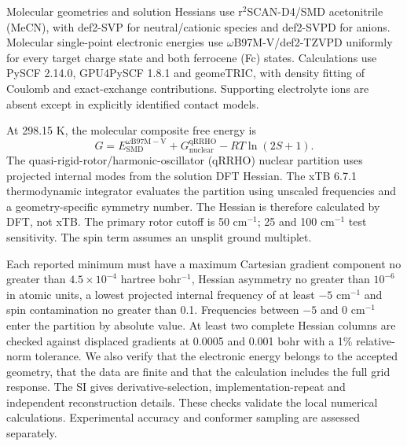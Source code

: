 \documentclass[11pt]{article}
\begin{document}
Molecular geometries and solution Hessians use r$^2$SCAN-D4/SMD acetonitrile (MeCN), with def2-SVP for neutral/cationic species and def2-SVPD for anions.\cite{r2scan2020,d42019,smd2009,def22005,diffuse2010} Molecular single-point electronic energies use $\omega$B97M-V/def2-TZVPD uniformly for every target charge state and both ferrocene (Fc) states.\cite{wb97mv2016} Calculations use PySCF 2.14.0, GPU4PySCF 1.8.1 and geomeTRIC, with density fitting of Coulomb and exact-exchange contributions.\cite{pyscf2020,gpu4pyscf2024,geometric2016} Supporting electrolyte ions are absent except in explicitly identified contact models.

At 298.15 K, the molecular composite free energy is
\begin{equation}
G=E_{\mathrm{SMD}}^{\omega\mathrm{B97M-V}}+G_{\mathrm{nuclear}}^{\mathrm{qRRHO}}-RT\ln(2S+1).
\label{eq:g}
\end{equation}
The quasi-rigid-rotor/harmonic-oscillator (qRRHO) nuclear partition uses projected internal modes from the solution DFT Hessian. The xTB 6.7.1 thermodynamic integrator evaluates the partition using unscaled frequencies and a geometry-specific symmetry number.\cite{grimme2012,xtbprogram2021} The Hessian is therefore calculated by DFT, not xTB. The primary rotor cutoff is 50 cm$^{-1}$; 25 and 100 cm$^{-1}$ test sensitivity. The spin term assumes an unsplit ground multiplet.

Each reported minimum must have a maximum Cartesian gradient component no greater than $4.5\times10^{-4}$ hartree bohr$^{-1}$, Hessian asymmetry no greater than $10^{-6}$ in atomic units, a lowest projected internal frequency of at least $-5$ cm$^{-1}$ and spin contamination no greater than 0.1. Frequencies between $-5$ and 0 cm$^{-1}$ enter the partition by absolute value. At least two complete Hessian columns are checked against displaced gradients at 0.0005 and 0.001 bohr with a 1\% relative-norm tolerance. We also verify that the electronic energy belongs to the accepted geometry, that the data are finite and that the calculation includes the full grid response. The SI gives derivative-selection, implementation-repeat and independent reconstruction details. These checks validate the local numerical calculations. Experimental accuracy and conformer sampling are assessed separately.
\end{document}
